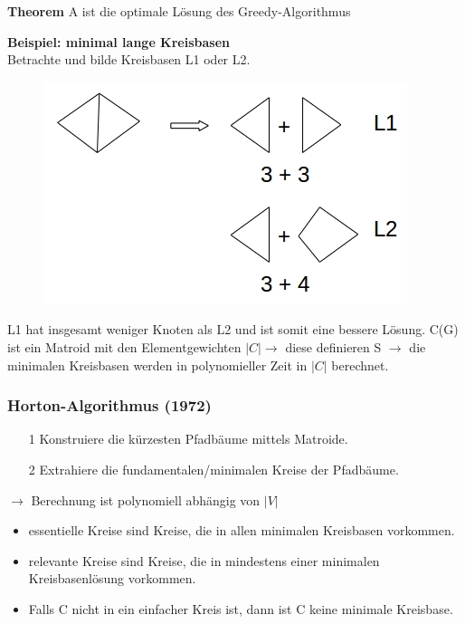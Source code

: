 \textbf{Theorem} \newline A ist die optimale Lösung des Greedy-Algorithmus \newline

\textbf{Beispiel: minimal lange Kreisbasen}\\
Betrachte und bilde Kreisbasen L1 oder L2.\\
\begin{figure}[htp]
\centering
\includegraphics[scale=1.00]{lectures/161111/pix/pic3.jpg}
\end{figure}
L1 hat insgesamt weniger Knoten als L2 und ist somit eine bessere Lösung. C(G) ist ein Matroid mit den Elementgewichten $|C| \rightarrow$ diese definieren S $\rightarrow$ die minimalen Kreisbasen werden in polynomieller Zeit in $|C|$ berechnet.
\subsubsection{Horton-Algorithmus (1972)}
\begin{itemize}
	\item[1]Konstruiere die kürzesten Pfadbäume mittels Matroide. 
	\item[2]Extrahiere die fundamentalen/minimalen Kreise der Pfadbäume.
\end{itemize}
$\rightarrow$ Berechnung ist polynomiell abhängig von $|V|$
\begin{itemize}
	\item essentielle Kreise sind Kreise, die in allen minimalen Kreisbasen vorkommen. 
	\item relevante Kreise sind Kreise, die in mindestens einer minimalen Kreisbasenlösung vorkommen.
	\item Falls C nicht in ein einfacher Kreis ist, dann ist C keine minimale Kreisbase.
\end{itemize}
